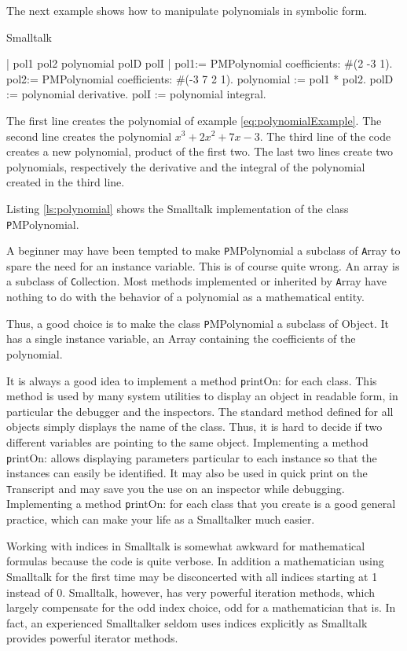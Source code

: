 The next example shows how to manipulate polynomials in symbolic
form.
\begin{listing}{Smalltalk}

 | pol1 pol2 polynomial polD polI |
 pol1:= PMPolynomial coefficients: #(2 -3 1).
 pol2:= PMPolynomial coefficients: #(-3 7 2 1).
 polynomial := pol1 * pol2.
 polD := polynomial derivative.
 polI := polynomial integral.
\end{listing}
The first line creates the  polynomial of example
\ref{eq:polynomialExample}. The second line creates the polynomial
$x^3+2x^2+7x-3$. The third line of the code creates a new
polynomial, product of the first two. The last two lines create
two polynomials, respectively the derivative and the integral of
the polynomial created in the third line.

Listing \ref{ls:polynomial} shows the Smalltalk implementation of
the class {\texttt PMPolynomial}.

A beginner may have been tempted to make {\texttt PMPolynomial} a
subclass of {\texttt Array} to spare the need for an instance
variable. This is of course quite wrong. An array is a subclass of
{\texttt Collection}. Most methods implemented or inherited by {\texttt
Array} have nothing to do with the behavior of a polynomial as a
mathematical entity.

Thus, a good choice is to make the class {\texttt PMPolynomial} a
subclass of Object. It has a single instance variable, an Array
containing the coefficients of the polynomial.

It is always a good idea to implement a method {\texttt printOn:} for
each class. This method is used by many system utilities to
display an object in readable form, in particular the debugger and
the inspectors. The standard method defined for all objects simply
displays the name of the class. Thus, it is hard to decide if two
different variables are pointing to the same object. Implementing
a method {\texttt printOn:} allows displaying parameters particular to
each instance so that the instances can easily be identified. It
may also be used in quick print on the {\texttt Transcript} and may
save you the use on an inspector while debugging. Implementing a
method {\texttt printOn:} for each class that you create is a good
general practice, which can make your life as a Smalltalker much
easier.

Working with indices in Smalltalk is somewhat awkward for
mathematical formulas because the code is quite verbose. In
addition a mathematician using Smalltalk for the first time may be
disconcerted with all indices starting at 1 instead of 0.
Smalltalk, however, has very powerful iteration methods, which
largely compensate for the odd index choice, odd for a
mathematician that is. In fact, an experienced Smalltalker seldom
uses indices explicitly as Smalltalk provides powerful iterator
methods.

